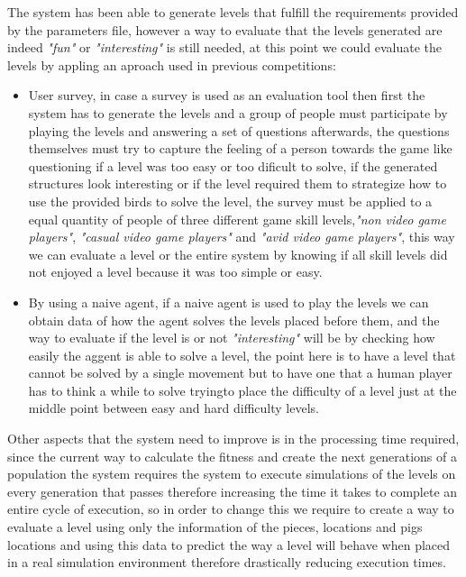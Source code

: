 \documentclass[conference]{IEEEtran}
\begin{document}
     The system has been able to generate levels that fulfill the requirements
     provided by the parameters file, however a way to evaluate that the levels
     generated are indeed \textit{"fun"} or \textit{"interesting"} is still
     needed, at this point we could evaluate the levels by appling an aproach
     used in previous competitions:
     \begin{itemize}
        \item User survey, in case a survey is used as an evaluation tool then first
        the system has to generate the levels and a group of people must participate
        by playing the levels and answering a set of questions afterwards, the
        questions themselves must try to capture the feeling of a person towards the
        game like questioning if a level was too easy or too dificult to solve, if
        the generated structures look interesting or if the level required them to
        strategize how to use the provided birds to solve the level, the survey must
        be applied to a equal quantity of people of three different game skill
        levels,\textit{"non video game players"}, \textit{"casual video game
        players"} and \textit{"avid video game players"}, this way we can evaluate a
        level or the entire system by knowing if all skill levels did not enjoyed a
        level because it was too simple or easy.
        \item By using a naive agent, if a naive agent is used to play the levels we
        can obtain data of how the agent solves the levels placed before them, and
        the way to evaluate if the level is or not \textit{"interesting"} will be by
        checking how easily the aggent is able to solve a level, the point here is
        to have a level that cannot be solved by a single movement but to have one
        that a human player has to think a while to solve tryingto place the
        difficulty of a level just at the middle point between easy and hard
        difficulty levels.
    \end{itemize}
        
    Other aspects that the system need to improve is in the processing time
    required, since the current way to calculate the fitness and create the next
    generations of a population the system requires the system to execute
    simulations of the levels on every generation that passes therefore increasing
    the time it takes to complete an entire cycle of execution, so in order to
    change this we require to create a way to evaluate a level using only the
    information of the pieces, locations and pigs locations and using this data to
    predict the way a level will behave when placed in a real simulation environment
    therefore drastically reducing execution times.
    
\end{document}
